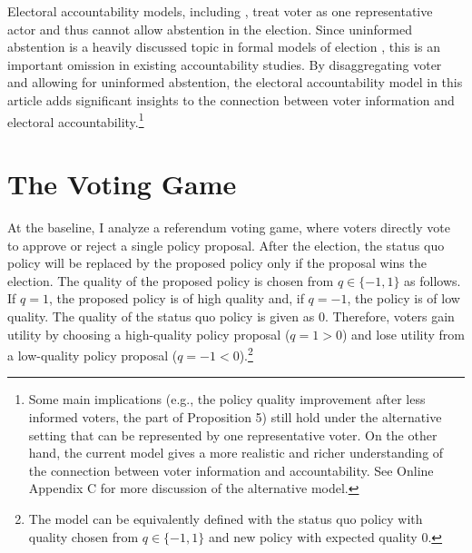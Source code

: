 \documentclass[letterpaper, 12pt]{article}
\begin{document}
    \par Electoral accountability models, including \cite{Ashworth2014isvo}, treat voter as one representative actor and thus cannot allow abstention in the election. Since uninformed abstention is a heavily discussed topic in formal models of election \citep{Matsusaka1995exvo, Feddersen1996thsw, Feddersen1999abin}, this is an important omission in existing accountability studies. By disaggregating voter and allowing for uninformed abstention, the electoral accountability model in this article adds significant insights to the connection between voter information and electoral accountability.\footnote{Some main implications (e.g., the policy quality improvement after less informed voters, the part of Proposition 5) still hold under the alternative setting that can be represented by one representative voter. On the other hand, the current model gives a more realistic and richer understanding of the connection between voter information and accountability. See Online Appendix C for more discussion of the alternative model.}
    
    \section*{The Voting Game}
    
    \par At the baseline, I analyze a referendum voting game, where voters directly vote to approve or reject a single policy proposal. After the election, the status quo policy will be replaced by the proposed policy only if the proposal wins the election. The quality of the proposed policy is chosen from $q \in \{-1, 1\}$ as follows. If $q=1$, the proposed policy is of high quality and, if $q=-1$, the policy is of low quality. The quality of the status quo policy is given as $0$. Therefore, voters gain utility by choosing a high-quality policy proposal ($q=1>0$) and lose utility from a low-quality policy proposal ($q=-1<0$).\footnote{The model can be equivalently defined with the status quo policy with quality chosen from $q \in \{-1, 1\}$ and new policy with expected quality $0$.}
    
\end{document}

